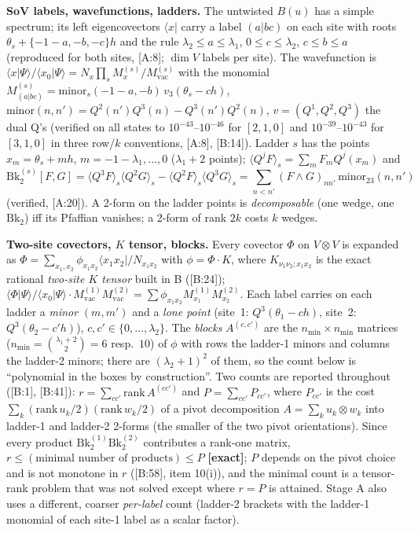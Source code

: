 \documentclass[10pt]{article}
\newcommand{\cl}[2]{\textsf{[#1:#2]}}
\newcommand{\tg}[1]{\textbf{[#1]}}
\newcommand{\Bk}{\mathrm{Bk}_2}
\newcommand{\bra}[1]{\langle #1|}
\newcommand{\vac}{\mathrm{vac}}
\begin{document}
\textbf{SoV labels, wavefunctions, ladders.} The untwisted $B(u)$ has a simple spectrum; its left eigencovectors $\bra{x}$ carry a label $(a|bc)$ on each site with roots $\theta_s+\{-1-a,-b,-c\}h$ and the rule $\lambda_2\le a\le\lambda_1$, $0\le c\le\lambda_2$, $c\le b\le a$ (reproduced for both sites, \cl{A}{8}; $\dim V$ labels per site). The wavefunction is $\langle x|\Psi\rangle/\langle x_0|\Psi\rangle=N_x\prod_s M^{(s)}_{x}/M^{(s)}_{\vac}$ with the monomial $M^{(s)}_{(a|bc)}=\mathrm{minor}_s(-1-a,-b)\,v_3(\theta_s-ch)$, $\mathrm{minor}(n,n')=Q^2(n')Q^3(n)-Q^3(n')Q^2(n)$, $v=(Q^1,Q^2,Q^3)$ the dual Q's (verified on all states to $10^{-43}$--$10^{-46}$ for $[2,1,0]$ and $10^{-39}$--$10^{-43}$ for $[3,1,0]$ in three row/$k$ conventions, \cl{A}{8}, \cl{B}{14}).
Ladder $s$ has the points $x_m=\theta_s+mh$, $m=-1-\lambda_1,\dots,0$ ($\lambda_1+2$ points); $\langle Q^jF\rangle_s=\sum_mF_mQ^j(x_m)$ and
\[
\Bk^{(s)}[F,G]=\langle Q^3F\rangle_s\langle Q^2G\rangle_s-\langle Q^2F\rangle_s\langle Q^3G\rangle_s=\sum_{n<n'}(F\wedge G)_{nn'}\,\mathrm{minor}_{23}(n,n')
\]
(verified, \cl{A}{20}). A 2-form on the ladder points is \emph{decomposable} (one wedge, one $\Bk$) iff its Pfaffian vanishes; a 2-form of rank $2k$ costs $k$ wedges.

\textbf{Two-site covectors, $K$ tensor, blocks.} Every covector $\Phi$ on $V\otimes V$ is expanded as $\Phi=\sum_{x_1,x_2}\phi_{x_1x_2}\bra{x_1x_2}/N_{x_1x_2}$ with $\phi=\Phi\cdot K$, where $K_{\nu_1\nu_2;x_1x_2}$ is the exact rational \emph{two-site $K$ tensor} built in B (\cl{B}{24}); $\langle\Phi|\Psi\rangle/\langle x_0|\Psi\rangle\cdot M^{(1)}_\vac M^{(2)}_\vac=\sum\phi_{x_1x_2}M^{(1)}_{x_1}M^{(2)}_{x_2}$. Each label carries on each ladder a \emph{minor} $(m,m')$ and a \emph{lone point} (site~1: $Q^3(\theta_1-ch)$, site~2: $Q^3(\theta_2-c'h)$), $c,c'\in\{0,\dots,\lambda_2\}$. The \emph{blocks} $A^{(c,c')}$ are the $n_{\min}\times n_{\min}$ matrices ($n_{\min}=\binom{\lambda_1+2}{2}=6$ resp.\ $10$) of $\phi$ with rows the ladder-1 minors and columns the ladder-2 minors; there are $(\lambda_2+1)^2$ of them, so the count below is ``polynomial in the boxes by construction''.
Two counts are reported throughout (\cl{B}{1}, \cl{B}{41}): $r=\sum_{cc'}\mathrm{rank}\,A^{(cc')}$ and $P=\sum_{cc'}P_{cc'}$, where $P_{cc'}$ is the cost $\sum_k(\mathrm{rank}\,u_k/2)(\mathrm{rank}\,w_k/2)$ of a pivot decomposition $A=\sum_ku_k\otimes w_k$ into ladder-1 and ladder-2 2-forms (the smaller of the two pivot orientations). Since every product $\Bk^{(1)}\Bk^{(2)}$ contributes a rank-one matrix, $r\le(\text{minimal number of products})\le P$ \tg{exact}; $P$ depends on the pivot choice and is not monotone in $r$ (\cl{B}{58}, item 10(i)), and the minimal count is a tensor-rank problem that was not solved except where $r=P$ is attained. Stage A also uses a different, coarser \emph{per-label} count (ladder-2 brackets with the ladder-1 monomial of each site-1 label as a scalar factor).
\end{document}
